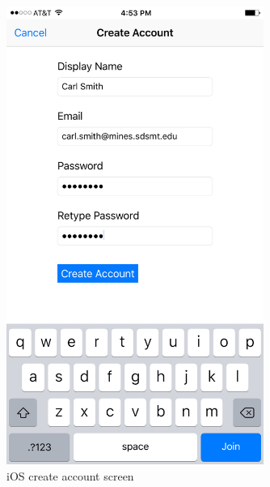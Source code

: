 	\begin{figure}[tbh]
	\begin{center}
	\includegraphics[width=0.75\textwidth]{iOSPictures/img_3897.png}
	\end{center}
	\caption{iOS create account screen \label{iOScreateAccountScreen}}
	\end{figure}

